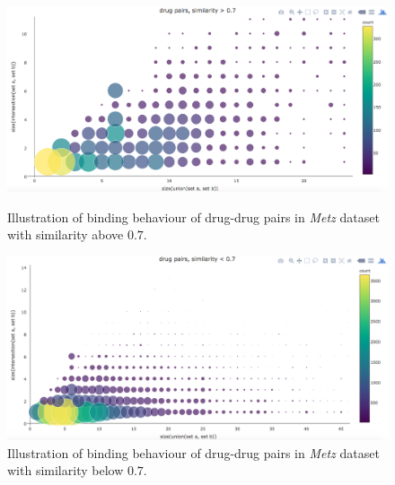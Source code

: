\begin{figure}[p]
\begin{center}
\includegraphics[scale=0.36]{metz_simi_above.png}
\end{center}
\caption[Correlation of drug-similarity and binding behaviour, similar drug pairs, Metz dataset]{Illustration of binding behaviour of drug-drug pairs in \textit{Metz} dataset  with similarity above $0.7$.}
\label{fig:metz_drug_simi_corr_1}
\begin{center}
\includegraphics[scale=0.36]{metz_simi_below.png}
\end{center}
\caption[Correlation of drug-similarity and binding behaviour, un-similar drug pairs, Metz dataset]{Illustration of binding behaviour of drug-drug pairs in \textit{Metz} dataset with similarity below $0.7$.}
\label{fig:metz_drug_simi_corr_2}
\end{figure}


